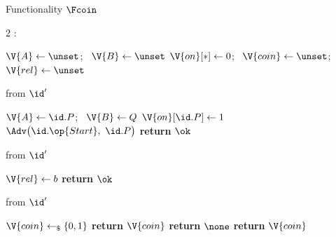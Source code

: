 \begin{interface}[nofloat]{Functionality $\Fcoin$ \\
\params{$\PID$, \quad $\Ps$, \quad $\admits$, \quad
$\uses := \{(\Adv,\serves)\}$, \quad $\pars := \none$}}

{\scriptsize
\setlength{\columnsep}{1.4em}
\begin{multicols}{2}
:
\begin{algorithmic}[1]
\setcounter{contline}{0}\algcont
\State $\V{A} \gets \unset$; \ $\V{B} \gets \unset$
\State $\V{on}[*] \gets 0$; \ $\V{coin} \gets \unset$; \ $\V{rel} \gets \unset$
\algsave
\end{algorithmic}
\vspace{1.4ex}

 \quad from $\id'$
\begin{algorithmic}[1]
\algcont
{}
  \State $\V{A} \gets \id.P$; \ $\V{B} \gets Q$ \label{ln:coinroles}
\EndIf
{}
\State $\V{on}[\id.P] \gets 1$
\State $\Adv\bigl(\id.\op{Start},\ \id.P\bigr)$
\State \textbf{return} $\ok$
\algsave
\end{algorithmic}
\vspace{1.4ex}

 \quad from $\id'$
\begin{algorithmic}[1]
\algcont
{} \label{ln:coinafter}
\State $\V{rel} \gets b$ \label{ln:coinchoice}
\State \textbf{return} $\ok$
\algsave
\end{algorithmic}
\vspace{1.4ex}

\columnbreak

 \quad from $\id'$
\begin{algorithmic}[1]
\algcont
{} \label{ln:coinboth}
    \State $\V{coin} \gets_{\$} \{0,1\}$ \label{ln:coindraw}
  \EndIf
  \State \textbf{return} $\V{coin}$ \label{ln:coinafirst}
\EndIf
{}
  \State \textbf{return} $\none$ \label{ln:coinfail}
\EndIf
\State \textbf{return} $\V{coin}$ \label{ln:coinbsecond}
\algsave
\end{algorithmic}
\vspace{1.4ex}


\end{multicols}}
\end{interface}
